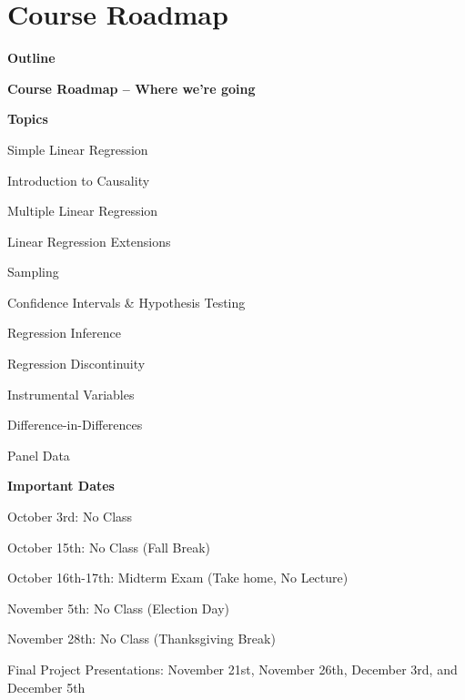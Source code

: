 \documentclass[11pt, aspectratio=169]{beamer}
\newenvironment{wideitemize}{\itemize\addtolength{\itemsep}{5pt}}{\enditemize}
\newenvironment{wideenumerate}{\enumerate\addtolength{\itemsep}{5pt}}{\endenumerate}
\begin{document}
\section{Course Roadmap}
	\begin{frame}{\bf \large Outline}
	\tableofcontents[currentsection]
\end{frame}
\begin{frame}{\bf \large Course Roadmap -- Where we're going}

\begin{minipage}{.5\textwidth}
\begin{wideitemize}
	\item \textbf{Topics}
	\begin{wideenumerate}
		\item Simple Linear Regression 
		\item Introduction to Causality
		\item Multiple Linear Regression
		\item Linear Regression Extensions
		\item Sampling
		\item Confidence Intervals \& Hypothesis Testing
		\item Regression Inference
		\item Regression Discontinuity
		\item Instrumental Variables
		\item Difference-in-Differences
		\item Panel Data
	\end{wideenumerate}
\end{wideitemize}
\end{minipage}\pause%
\begin{minipage}{.5\textwidth}
	\begin{wideitemize}
		\item \textbf{Important Dates}
		\begin{wideitemize}
			\item	October 3rd: No Class
			\item	October 15th: No Class (Fall Break)
			\item	October 16th-17th: Midterm Exam (Take home, No Lecture)
			\item	November 5th: No Class (Election Day)
			\item	November 28th: No Class (Thanksgiving Break)
			\item	Final Project Presentations: November 21st, November 26th, December 3rd, and December 5th 
		\end{wideitemize}
	\end{wideitemize}
\end{minipage}
\end{frame}

\end{document}
